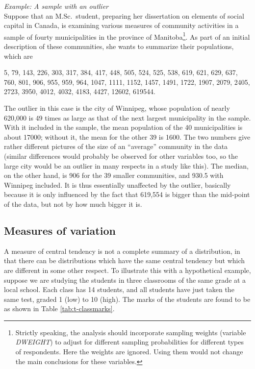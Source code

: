 \documentclass[11pt,a4paper,openany]{book}
\let\rmarkdownfootnote\footnote%
\def\footnote{\protect\rmarkdownfootnote}
\begin{document}
\emph{Example: A sample with an outlier}\\
Suppose that an M.Sc.~student, preparing her dissertation on elements of
social capital in Canada, is examining various measures of community
activities in a sample of fourty municipalities in the province of
Manitoba\footnote{Strictly speaking, the analysis should incorporate
  sampling weights (variable \emph{DWEIGHT}) to adjust for different
  sampling probabilities for different types of respondents. Here the
  weights are ignored. Using them would not change the main conclusions
  for these variables.}. As part of an initial description of these
communities, she wants to summarize their populations, which are

5, 79, 143, 226, 303, 317, 384, 417, 448, 505, 524, 525, 538, 619, 621,
629, 637, 760, 801, 906, 955, 959, 964, 1047, 1111, 1152, 1457, 1491,
1722, 1907, 2079, 2405, 2723, 3950, 4012, 4032, 4183, 4427, 12602,
619544.

The outlier in this case is the city of Winnipeg, whose population of
nearly 620,000 is 49 times as large as that of the next largest
municipality in the sample. With it included in the sample, the mean
population of the 40 municipalities is about 17000; without it, the mean
for the other 39 is 1600. The two numbers give rather different pictures
of the size of an ``average'' community in the data (similar differences
would probably be observed for other variables too, so the large city
would be an outlier in many respects in a study like this). The median,
on the other hand, is 906 for the 39 smaller communities, and 930.5 with
Winnipeg included. It is thus essentially unaffected by the outlier,
basically because it is only influenced by the fact that 619,554 is
bigger than the mid-point of the data, but not by how much bigger it is.

\subsection{Measures of variation}\label{ss-descr1-nums-variation}

A measure of central tendency is not a complete summary of a
distribution, in that there can be distributions which have the same
central tendency but which are different in some other respect. To
illustrate this with a hypothetical example, suppose we are studying the
students in three classrooms of the same grade at a local school. Each
class has 14 students, and all students have just taken the same test,
graded 1 (low) to 10 (high). The marks of the students are found to be
as shown in Table \ref{tab:t-classmarks}.
\end{document}
